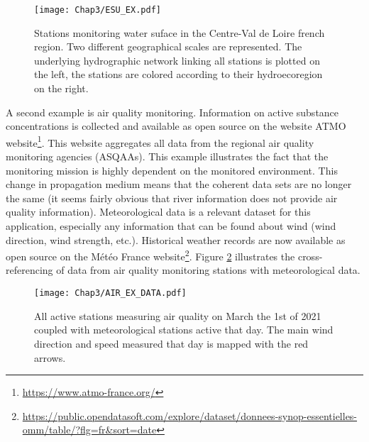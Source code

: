 \begin{figure}[ht]
    \centering
    \texttt{[image: Chap3/ESU\_EX.pdf]}
    \caption{Stations monitoring water suface in the Centre-Val de Loire french region. Two different geographical scales are represented. The underlying hydrographic network linking all stations is plotted on the left, the stations are colored according to their hydroecoregion on the right.}
    \label{fig:esu_ex}
\end{figure}

A second example is air quality monitoring. Information on active substance concentrations is collected and available as open source on the website ATMO website\footnote{\url{https://www.atmo-france.org/}}. This website aggregates all data from the regional air quality monitoring agencies (ASQAAs). This example illustrates the fact that the monitoring mission is highly dependent on the monitored environment. This change in propagation medium means that the coherent data sets are no longer the same (it seems fairly obvious that river information does not provide air quality information). Meteorological data is a relevant dataset for this application, especially any information that can be found about wind (wind direction, wind strength, etc.). Historical weather records are now available as open source on the Météo France website\footnote{\url{https://public.opendatasoft.com/explore/dataset/donnees-synop-essentielles-omm/table/?flg=fr&sort=date}}. Figure \ref{fig:air_ex} illustrates the cross-referencing of data from air quality monitoring stations with meteorological data.

\begin{figure}[ht]
    \centering
    \texttt{[image: Chap3/AIR\_EX\_DATA.pdf]}
    \caption{All active stations measuring air quality on March the 1st of 2021 coupled with meteorological stations active that day. The main wind direction and speed measured that day is mapped with the red arrows.}
    \label{fig:air_ex}
\end{figure}

